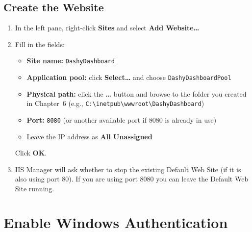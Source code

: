 \documentclass[12pt,a4paper]{report}
\begin{document}
\section{Create the Website}
\begin{enumerate}
  \item In the left pane, right-click \textbf{Sites} and select \textbf{Add Website\ldots}

  \item Fill in the fields:
  \begin{itemize}
    \item \textbf{Site name:} \texttt{DashyDashboard}
    \item \textbf{Application pool:} click \textbf{Select\ldots} and choose \texttt{DashyDashboardPool}
    \item \textbf{Physical path:} click the \textbf{\ldots} button and browse to the folder you created in Chapter~6 (e.g., \texttt{C:\textbackslash inetpub\textbackslash wwwroot\textbackslash DashyDashboard})
    \item \textbf{Port:} \texttt{8080} (or another available port if 8080 is already in use)
    \item Leave the IP address as \textbf{All Unassigned}
  \end{itemize}
  Click \textbf{OK}.

  \item IIS Manager will ask whether to stop the existing Default Web Site (if it is also using port 80). If you are using port 8080 you can leave the Default Web Site running.
\end{enumerate}

\chapter{Enable Windows Authentication}
\end{document}
